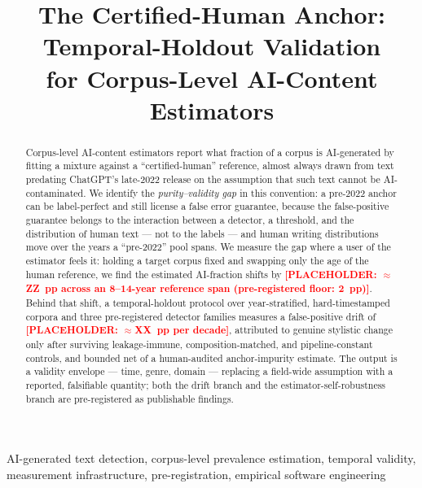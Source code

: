 \documentclass[conference]{IEEEtran}
\newcommand{\placeholder}[1]{\textcolor{red}{\textbf{[PLACEHOLDER: #1]}}}
\begin{document}
\title{The Certified-Human Anchor: Temporal-Holdout Validation\\ for Corpus-Level AI-Content Estimators}

\author{
}

\maketitle

\begin{abstract}
Corpus-level AI-content estimators report what fraction of a corpus is AI-generated by fitting a mixture against a ``certified-human'' reference, almost always drawn from text predating ChatGPT's late-2022 release on the assumption that such text cannot be AI-contaminated. We identify the \emph{purity--validity gap} in this convention: a pre-2022 anchor can be label-perfect and still license a false error guarantee, because the false-positive guarantee belongs to the interaction between a detector, a threshold, and the distribution of human text --- not to the labels --- and human writing distributions move over the years a ``pre-2022'' pool spans. We measure the gap where a user of the estimator feels it: holding a target corpus fixed and swapping only the age of the human reference, we find the estimated AI-fraction shifts by \placeholder{$\approx$ZZ~pp across an 8--14-year reference span (pre-registered floor: 2~pp)}. Behind that shift, a temporal-holdout protocol over year-stratified, hard-timestamped corpora and three pre-registered detector families measures a false-positive drift of \placeholder{$\approx$XX~pp per decade}, attributed to genuine stylistic change only after surviving leakage-immune, composition-matched, and pipeline-constant controls, and bounded net of a human-audited anchor-impurity estimate. The output is a validity envelope --- time, genre, domain --- replacing a field-wide assumption with a reported, falsifiable quantity; both the drift branch and the estimator-self-robustness branch are pre-registered as publishable findings.
\end{abstract}

\begin{IEEEkeywords}
AI-generated text detection, corpus-level prevalence estimation, temporal validity, measurement infrastructure, pre-registration, empirical software engineering
\end{IEEEkeywords}
\end{document}
